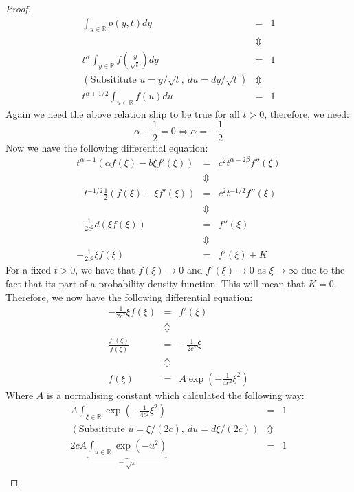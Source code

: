 \documentclass[11pt]{article}
\theoremstyle{definition}
\newcommand{\brac}[1]{\left(#1\right)}
\newcommand{\R}{\mathbb{R}}
\begin{document}
\begin{proof}
		\begin{eqnarray*}
			\int_{y\in\R}p\brac{y,t}dy &=& 1 \\
			&\Updownarrow&\\
			t^\alpha\int_{y\in\R}f\brac{\frac{y}{\sqrt{t}}}dy &=& 1\\
			\brac{\text{Subsititute } u = y/\sqrt{t},~ du = dy/\sqrt{t}}&\Updownarrow&\\
			t^{\alpha+1/2}\int_{u\in\R}f\brac{u}du &=& 1 
		\end{eqnarray*}
		Again we need the above relation ship to be true for all $t>0$, therefore, we need:
		$$\alpha + \frac{1}{2} = 0 \Leftrightarrow \alpha = -\frac{1}{2}$$
		Now we have the following differential equation:
		\begin{eqnarray*}
			t^{\alpha -1}\brac{\alpha f\brac{\xi} -b\xi f'\brac{\xi}} &=& c^2t^{\alpha-2\beta} f''\brac{\xi}\\
			&\Updownarrow&\\
			-t^{-1/2}\frac{1}{2}\brac{f\brac{\xi} + \xi f'\brac{\xi}}&=& c^2t^{-1/2}f''\brac{\xi}\\
			&\Updownarrow&\\
			-\frac{1}{2c^2}d\brac{\xi f\brac{\xi}} &=& f''\brac{\xi}\\
			&\Updownarrow&\\
			-\frac{1}{2c^2}\xi f\brac{\xi} &=& f'\brac{\xi} + K
		\end{eqnarray*}
		For a fixed $t>0$, we have that $f\brac{\xi}\rightarrow 0$ and $f'\brac{\xi}\rightarrow 0$ as $\xi\rightarrow\infty$ due to the fact that its part of a probability density function. This will mean that $K=0$. Therefore, we now have the following differential equation:
		\begin{eqnarray*}
			-\frac{1}{2c^2}\xi f\brac{\xi} &=& f'\brac{\xi}\\
			&\Updownarrow& \\
			\frac{f'\brac{\xi}}{f\brac{\xi}} &=& -\frac{1}{2c^2}\xi\\
			&\Updownarrow& \\
			f\brac{\xi} &=& A\exp\brac{-\frac{1}{4c^2}\xi^2}
		\end{eqnarray*}
		Where $A$ is a normalising constant which calculated the following way:
		\begin{eqnarray*}
			A\int_{\xi\in\R}\exp\brac{-\frac{1}{4c^2}\xi^2} &=& 1\\
			\brac{\text{Subsititute } u = \xi/\brac{2c},~ du = d\xi/\brac{2c}}&\Updownarrow&\\
			2cA\underbrace{\int_{u\in\R}\exp\brac{-u^2} }_{=\sqrt{\pi}}&=& 1\\

\end{eqnarray*}
\end{proof}
\end{document}
